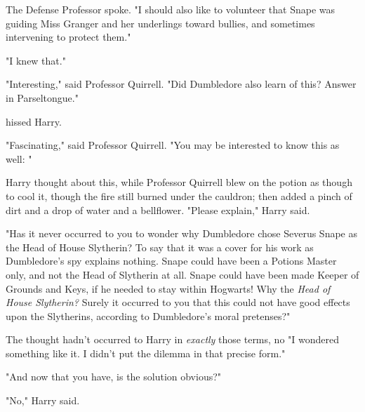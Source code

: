 The Defense Professor spoke. "I should also like to volunteer that Snape was
guiding Miss Granger and her underlings toward bullies, and sometimes
intervening to protect them."

"I knew that."

"Interesting," said Professor Quirrell. "Did Dumbledore also learn of this?
Answer in Parseltongue."

 hissed Harry.

"Fascinating," said Professor Quirrell. "You may be interested to know this as
well: "

Harry thought about this, while Professor Quirrell blew on the potion as though
to cool it, though the fire still burned under the cauldron; then added a pinch
of dirt and a drop of water and a bellflower. "Please explain," Harry said.

"Has it never occurred to you to wonder why Dumbledore chose Severus Snape as
the Head of House Slytherin? To say that it was a cover for his work as
Dumbledore's spy explains nothing. Snape could have been a Potions Master only,
and not the Head of Slytherin at all. Snape could have been made Keeper of
Grounds and Keys, if he needed to stay within Hogwarts! Why the \emph{Head of
House Slytherin?} Surely it occurred to you that this could not have good
effects upon the Slytherins, according to Dumbledore's moral pretenses?"

The thought hadn't occurred to Harry in \emph{exactly} those terms, no{\el}
"I wondered something like it. I didn't put the dilemma in that precise form."

"And now that you have, is the solution obvious?"

"No," Harry said.

